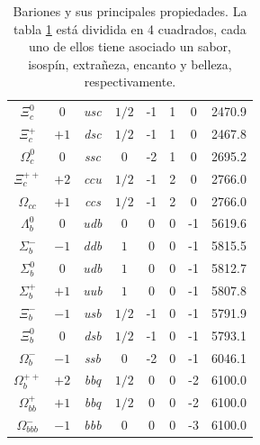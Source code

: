 \begin{table}[h]
\begin{tabular}{|c|c|c|c|c|c|c|c|}
$\Xi_{c}^{0}$     & $0$  & \textit{usc} & $1/2$  & -1          & 1           & 0           & 2470.9 \\
$\Xi_{c}^{+}$     & $+1$ & \textit{dsc} & $1/2$  & -1          & 1           & 0           & 2467.8 \\
$\Omega_{c}^{0}$  & $0$  & \textit{ssc} & $0$    & -2          & 1           & 0           & 2695.2 \\
$\Xi_{c}^{++}$ & $+2$ & \textit{ccu} & $1/2$  & -1          & 2           & 0           & 2766.0 \\
$\Omega_{cc}$  & $+1$ & \textit{ccs} & $1/2$  & -1          & 2           & 0           & 2766.0 \\ \hline \hline
$\Lambda_{b}^{0}$ & $0$  & \textit{udb} & $0$    & 0           & 0           & -1          & 5619.6 \\
$\Sigma_{b}^{-}$  & $-1$ & \textit{ddb} & $1$    & 0           & 0           & -1          & 5815.5 \\
$\Sigma_{b}^{0}$  & $0$  & \textit{udb} & $1$    & 0           & 0           & -1          & 5812.7 \\
$\Sigma_{b}^{+}$  & $+1$ & \textit{uub} & $1$    & 0           & 0           & -1          & 5807.8 \\
$\Xi_{b}^{-}$     & $-1$ & \textit{usb} & $1/2$  & -1          & 0           & -1          & 5791.9 \\
$\Xi_{b}^{0}$     & $0$  & \textit{dsb} & $1/2$  & -1          & 0           & -1          & 5793.1 \\
$\Omega_{b}^{-}$  & $-1$ & \textit{ssb} & $0$    & -2          & 0           & -1          & 6046.1 \\
$\Omega_{b}^{++}$ & $+2$ & \textit{bbq} & $1/2$  & 0           & 0           & -2          & 6100.0 \\
$\Omega_{bb}^{+}$  & $+1$ & \textit{bbq} & $1/2$  & 0           & 0           & -2          & 6100.0 \\
$\Omega_{bbb}^{-}$  & $-1$ & \textit{bbb} & $0$    & 0           & 0           & -3          & 6100.0 \\ \hline
\end{tabular}
\caption{Bariones y sus principales propiedades. La tabla \ref{tab: Bariones} está dividida en 4 cuadrados, cada uno de ellos tiene asociado un sabor, isospín, extrañeza, encanto y belleza, respectivamente.}
\label{tab: Bariones}
\end{table}

